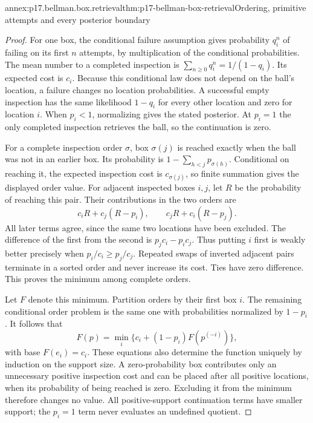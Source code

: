\begin{annexitem}{annex:p17.bellman.box.retrieval}{thm:p17-bellman-box-retrieval}{Ordering, primitive attempts and every posterior boundary}
\begin{proof}
For one box, the conditional
failure assumption gives
probability \(q_i^n\) of
failing on its first \(n\)
attempts, by multiplication
of the conditional probabilities.
The mean number to a completed
inspection is
\(\sum_{n\geq0}q_i^n=1/(1-q_i)\).
Its expected cost is \(c_i\).
Because this conditional law
does not depend on the ball's
location, a failure changes
no location probabilities.
A successful empty inspection
has the same likelihood \(1-q_i\)
for every other location and
zero for location \(i\).
When \(p_i<1\), normalizing
gives the stated posterior.
At \(p_i=1\) the only completed
inspection retrieves the ball,
so the continuation is zero.

For a complete inspection order
\(\sigma\), box \(\sigma(j)\)
is reached exactly when the
ball was not in an earlier
box. Its probability is
\(1-\sum_{h<j}p_{\sigma(h)}\).
Conditional on reaching it,
the expected inspection cost
is \(c_{\sigma(j)}\), so
finite summation gives the
displayed order value.
For adjacent inspected boxes
\(i,j\), let \(R\) be the
probability of reaching this
pair. Their contributions in
the two orders are
\[
            c_iR+c_j(R-p_i),\qquad
            c_jR+c_i(R-p_j).
\]
All later terms agree, since
the same two locations have
been excluded. The difference
of the first from the second
is \(p_jc_i-p_ic_j\).
Thus putting \(i\) first is
weakly better precisely when
\(p_i/c_i\geq p_j/c_j\).
Repeated swaps of inverted
adjacent pairs terminate in
a sorted order and never
increase its cost. Ties
have zero difference.
This proves the minimum
among complete orders.

Let \(F\) denote this minimum.
Partition orders by their first
box \(i\). The remaining
conditional order problem is
the same one with probabilities
normalized by \(1-p_i\).
It follows that
\[
                   F(p)=\min_i\{c_i+(1-p_i)F(p^{(-i)})\},
\]
with base \(F(e_i)=c_i\).
These equations also determine
the function uniquely by
induction on the support size.
A zero-probability box contributes
only an unnecessary positive
inspection cost and can be
placed after all positive
locations, when its probability
of being reached is zero.
Excluding it from the minimum
therefore changes no value.
All positive-support continuation
terms have smaller support;
the \(p_i=1\) term never
evaluates an undefined quotient.


\end{proof}
\end{annexitem}
